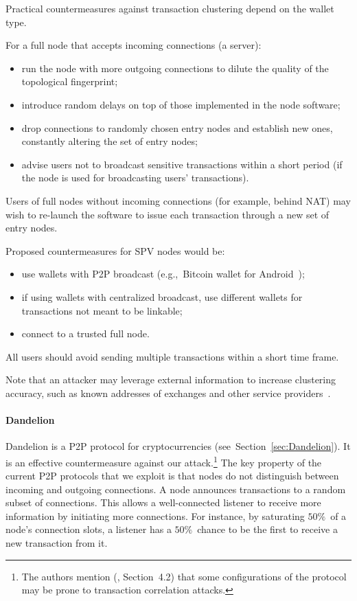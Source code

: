 Practical countermeasures against transaction clustering depend on the wallet type.

For a full node that accepts incoming connections (a server):

\begin{itemize}
	\item run the node with more outgoing connections to dilute the quality of the topological fingerprint;
	\item introduce random delays on top of those implemented in the node software;
	\item drop connections to randomly chosen entry nodes and establish new ones, constantly altering the set of entry nodes;
	\item advise users not to broadcast sensitive transactions within a short period (if the node is used for broadcasting users' transactions).
\end{itemize}

Users of full nodes without incoming connections (for example, behind NAT) may wish to re-launch the software to issue each transaction through a new set of entry nodes.

Proposed countermeasures for SPV nodes would be:

\begin{itemize}
	\item use wallets with P2P broadcast (e.g.,~Bitcoin wallet for Android~\cite{BitcoinWallet});
	\item if using wallets with centralized broadcast, use different wallets for transactions not meant to be linkable;
	\item connect to a trusted full node.
\end{itemize}

All users should avoid sending multiple transactions within a short time frame.

Note that an attacker may leverage external information to increase clustering accuracy, such as known addresses of exchanges and other service providers~\cite{Walletexplorer}.

\paragraph{Dandelion}
Dandelion is a P2P protocol for cryptocurrencies (see~Section~\ref{sec:Dandelion}).
It is an effective countermeasure against our attack.\footnote{The authors mention (\cite{Fanti2018}, Section~4.2) that some configurations of the protocol may be prone to transaction correlation attacks.}
The key property of the current P2P protocols that we exploit is that nodes do not distinguish between incoming and outgoing connections.
A node announces transactions to a random subset of connections.
This allows a well-connected listener to receive more information by initiating more connections.
For instance, by saturating $50\%$~of a node's connection slots, a listener has a $50\%$~chance to be the first to receive a new transaction from it.

